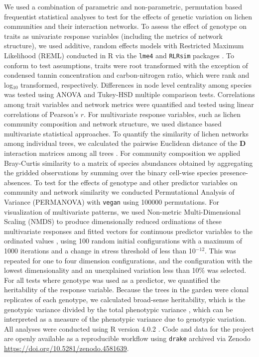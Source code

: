 \documentclass[fleqn,12pt]{olplainarticle}
\begin{document}
We used a combination of parametric and non-parametric, permutation
based frequentist statistical analyses to test for the effects of
genetic variation on lichen communities and their interaction
networks. To assess the effect of genotype on traits as univariate
response variables (including the metrics of network structure), we
used additive, random effects models with Restricted Maximum
Likelihood (REML) conducted in R via the \texttt{lme4} and
\texttt{RLRsim} packages \citep{lme4, RLRsim}. To conform to test
assumptions, traits were root transformed with the exception of
condensed tannin concentration and carbon-nitrogen ratio, which were
rank and log$_{10}$ transformed, respectively. Differences in node
level centrality among species was tested using ANOVA and Tukey-HSD
multiple comparison tests. Correlations among trait variables and
network metrics were quantified and tested using linear correlations
of Pearson's $r$. For multivariate response variables, such as lichen
community composition and network structure, we used distance based
multivariate statistical approaches. To quantify the similarity of
lichen networks among individual trees, we calculated the pairwise
Euclidean distance of the $\mathbf{D}$ interaction matrices among all
trees \citep{Newman2010}. For community composition we applied
Bray-Curtis similarity to a matrix of species abundances obtained by
aggregating the gridded observations by summing over the binary
cell-wise species presence-absences. To test for the effects of
genotype and other predictor variables on community and network
similarity we conducted Permutational Analysis of Variance (PERMANOVA)
with \texttt{vegan} \citep{vegan} using 100000 permutations. For
visualization of multivariate patterns, we used Non-metric
Multi-Dimensional Scaling (NMDS) \citep{ecodist} to produce
dimensionally reduced ordinations of these multivariate responses and
fitted vectors for continuous predictor variables to the ordinated
values \citep{vegan}, using 100 random initial configurations with a
maximum of 1000 iterations and a change in stress threshold of less
than 10$^{-12}$. This was repeated for one to four dimension
configurations, and the configuration with the lowest dimensionality
and an unexplained variation less than 10\% was selected. For all
tests where genotype was used as a predictor, we quantified the
heritability of the response variable. Because the trees in the garden
were clonal replicates of each genotype, we calculated broad-sense
heritability, which is the genotypic variance divided by the total
phenotypic variance \citep{Conner2004ATextbook}, which can be
interpreted as a measure of the phenotypic variance due to genotypic
variation. All analyses were conducted using R version 4.0.2
\citep{R2020}. Code and data for the project are openly available as a
reproducible workflow using \texttt{drake} \citep{drake} archived via
Zenodo \url{https://doi.org/10.5281/zenodo.4581639}.
\end{document}
